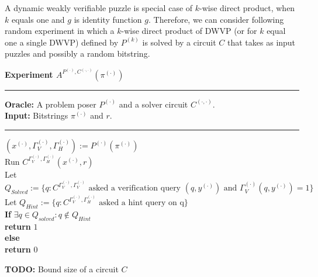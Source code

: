 %
A dynamic weakly verifiable puzzle is special case of $k$-wise direct product, when
$k$ equals one and $g$ is identity function $g$.
Therefore, we can consider following random experiment in which a $k$-wise direct product of DWVP (or for $k$ equal one a single DWVP) 
defined by $P^{(k)}$ is solved by a circuit $C$ that takes as input puzzles and possibly a random bitstring.
%
\begin{codeblock}
  \textbf{Experiment $A^{P^{(\cdot)}, C^{(\cdot, \cdot)}}(\pi^{(\cdot)})$}
  \medskip
  \hrule
  \medskip
  \textbf{Oracle:} A problem poser $P^{(\cdot)}$ and a solver circuit $C^{(\cdot,\cdot)}$.\\
  \textbf{Input:}  Bitstrings $\pi^{(\cdot)}$ and $r$.
  \medskip\hrule\medskip
  $(x^{(\cdot)}, \Gamma_V^{(\cdot)}, \Gamma_H^{(\cdot)}) := P^{(\cdot)}(\pi^{(\cdot)})$ \\
  Run $C^{\Gamma_V^{(\cdot)},\Gamma_H^{(\cdot)}}(x^{(\cdot)}, r)$ \\
  \IndI Let $Q_{Solved} := \{q: \text{$C^{\Gamma_V^{(\cdot)}, \Gamma_V^{(\cdot)}}$ asked a verification query $(q,y^{(\cdot)})$ and $\Gamma_V^{(\cdot)}(q, y^{(\cdot)}) = 1$} \}$\\
  \IndI Let $Q_{Hint} := \{q: \text{$C^{\Gamma_V^{(\cdot)}, \Gamma_H^{(\cdot)}}$ asked a hint query on q} \}$\\
  \textbf{If} $\exists q \in Q_{solved} : q \notin Q_{Hint}$ \then \\
  \IndI \textbf{return} $1$\\
  \textbf{else} \\
  \IndI \textbf{return} $0$\\
\end{codeblock}
%
\begin{todo}
  \textbf{TODO:} Bound size of a circuit $C$
\end{todo}
%
